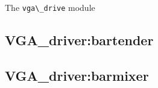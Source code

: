 The \verb+vga\_drive+ module 

  \subsection{VGA\_driver:bartender}
  \subsection{VGA\_driver:barmixer}

